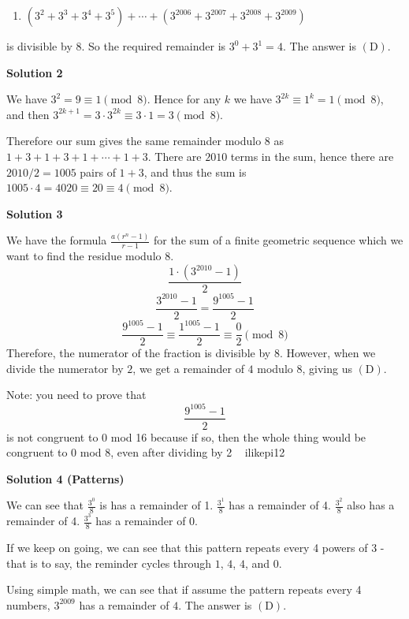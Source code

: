 \begin{enumerate}
 
            \begin{enumerate}[label=(\roman*)]
                \item $(3^2 + 3^3 + 3^4 + 3^5) + \cdots + (3^{2006} + 3^{2007} + 3^{2008} + 3^{2009})$
            \end{enumerate}
            is divisible by 8.  So the required remainder is $3^0 + 3^1 = \boxed {4}$. The answer is $\mathrm{(D)}$.

 



\textbf{Solution 2}

We have $3^2 = 9 \equiv 1 \pmod 8$. Hence for any $k$ we have $3^{2k}\equiv 1^k = 1 \pmod 8$, and then $3^{2k+1} = 3\cdot 3^{2k} \equiv 3\cdot 1 = 3  \pmod 8$.

 Therefore our sum gives the same remainder modulo $8$ as $1 + 3 + 1 + 3 + 1 + \cdots + 1 + 3$. There are $2010$ terms in the sum, hence there are $2010/2 = 1005$ pairs of $1+3$, and thus the sum is $1005 \cdot 4 = 4020 \equiv 20 \equiv \boxed{4} \pmod 8$.

 



\textbf{Solution 3}

We have the formula $\frac{a(r^n-1)}{r-1}$ for the sum of a finite geometric sequence which we want to find the residue modulo 8.
 \[\frac{1 \cdot (3^{2010}-1)}{2}\]
 \[\frac{3^{2010}-1}{2} = \frac{9^{1005}-1}{2}\]
 \[\frac{9^{1005}-1}{2} \equiv \frac{1^{1005}-1}{2} \equiv \frac{0}{2} \pmod 8\]Therefore, the numerator of the fraction is divisible by $8$. However, when we divide the numerator by $2$, we get a remainder of $4$ modulo $8$, giving us $\mathrm{(D)}$.

 Note: you need to prove that 
 \[\frac{9^{1005}-1}{2}\] is not congruent to 0 mod 16 because if so, then the whole thing would be congruent to 0 mod 8, even after dividing by 2 ~ ilikepi12

 



\textbf{Solution 4 (Patterns)}

We can see that $\frac{3^0}{8}$ is has a remainder of 1. $\frac{3^1}{8}$ has a remainder of 4. $\frac{3^2}{8}$ also has a remainder of 4. $\frac{3^3}{8}$ has a remainder of 0.

 If we keep on going, we can see that this pattern repeats every 4 powers of 3 - that is to say, the reminder cycles through $1$, $4$, $4$, and $0$.

 Using simple math, we can see that if assume the pattern repeats every 4 numbers, $3^{2009}$ has a remainder of $\boxed {4}$. The answer is $\mathrm{(D)}$.


\end{enumerate}
